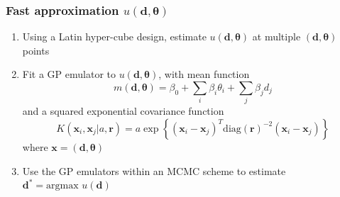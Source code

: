 \documentclass[t,compress]{beamer}
\newcommand{\btheta}{\boldsymbol{\theta}}
\newcommand{\bd}{\boldsymbol{d}}
\newcommand{\bx}{\boldsymbol{x}}
\newcommand{\br}{\boldsymbol{r}}
\begin{document}
\begin{frame}
\frametitle{Fast approximation $u(\bd, \btheta)$}

\begin{enumerate}
\item Using a Latin hyper-cube design, estimate $u(\bd, \btheta)$ at multiple $(\bd, \btheta)$ points
\item Fit a GP emulator to $u(\bd, \btheta)$, with mean function
\[
m(\bd, \btheta) = \beta_0 + \sum_i \beta_i \theta_i + \sum_j \beta_j d_j 
\]
and a squared exponential covariance function
\[
   K(\bx_i,\bx_j | a, \br ) = a \exp \left \{ (\bx_i-\bx_j)^T
     \text{diag}(\br)^{-2}(\bx_i-\bx_j)\right \}
\]
where  $\bx=(\bd,\btheta)$ 
\item Use the GP emulators within an MCMC scheme to estimate $\bd^*=\text{argmax
  } u(\bd)$

\end{enumerate}

\end{frame}
\end{document}
